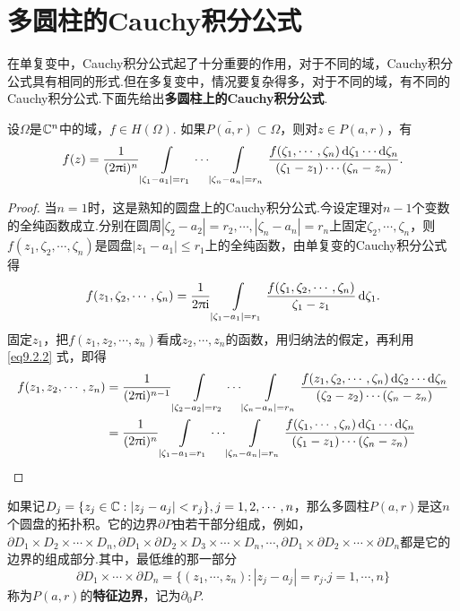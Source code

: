 \section{多圆柱的Cauchy积分公式\label{sec9.2}}
在单复变中，Cauchy积分公式起了十分重要的作用，对于不同的域，Cauchy积分公式具有相同的形式.但在多复变中，情况要复杂得多，对于不同的域，有不同的Cauchy积分公式.下面先给出\textbf{多圆柱上的Cauchy积分公式}.
\begin{theorem}\label{thm9.2.1}
设$\Omega$是$\mathbb C^n$中的域，$f\in H(\Omega)$. 如果$\bar{P(a,r)}\subset \Omega$，则对$z\in P(a,r)$，有
\begin{equation}\label{eq9.2.1}
f(z)=\frac1{(2\uppi\mathrm i)^n}\int\limits_{|\zeta_1-a_1|=r_1}\cdots\int\limits_{|\zeta_n-a_n|=r_n}
\frac{f(\zeta_1,\cdots,\zeta_n)\mathop{}\!\mathrm{d} \zeta_1\cdots\mathop{}\!\mathrm{d} \zeta_n}{(\zeta_1-z_1)\cdots(\zeta_n-z_n)}.
\end{equation}
\end{theorem}
\begin{proof}
当$n=1$时，这是熟知的圆盘上的Cauchy积分公式.今设定理对$n-1$个变数的全纯函数成立.分别在圆周$|\zeta_2-a_2|=r_2,\cdots,|\zeta_n-a_n|=r_n$上固定$\zeta_2,\cdots,\zeta_n$，则$f(z_1,\zeta_2,\cdots,\zeta_n)$是圆盘$|z_1-a_1|\le r_1$上的全纯函数，由单复变的Cauchy积分公式得
\begin{equation}\label{eq9.2.2}
f(z_1,\zeta_2,\cdots,\zeta_n)=\frac1{2\uppi\mathrm i}\int\limits_{|\zeta_1-a_1|=r_1}
\frac{f(\zeta_1,\zeta_2,\cdots,\zeta_n)}{\zeta_1-z_1}\mathop{}\!\mathrm{d} \zeta_1.
\end{equation}
固定$z_1$，把$f(z_1,z_2,\cdots,z_n)$看成$z_2,\cdots,z_n$的函数，用归纳法的假定，再利用 \eqref{eq9.2.2} 式，即得
\begin{align*}
  f(z_1,z_2,\cdots,z_n)&=\frac1{(2\uppi\mathrm i)^{n-1}}\int\limits_{|\zeta_2-a_2|=r_2}\cdots\int\limits_{|\zeta_n-a_n|=r_n}
  \frac{f(z_1,\zeta_2,\cdots,\zeta_n)\mathop{}\!\mathrm{d} \zeta_2\cdots
  \mathop{}\!\mathrm{d} \zeta_n}{(\zeta_2-z_2)\cdots(\zeta_n-z_n)}\\
  & = \frac1{(2\uppi\mathrm i)^n}\int\limits_{|\zeta_1-a_1=r_1} \cdots\int\limits_{|\zeta_n-a_n|=r_n}
  \frac{f(\zeta_1,\cdots,\zeta_n)\mathop{}\!\mathrm{d} \zeta_1\cdots
  \mathop{}\!\mathrm{d} \zeta_n}{(\zeta_1-z_1)\cdots(\zeta_n-z_n)} \qedhere
\end{align*}
\end{proof}

如果记$D_j=\{z_j\in\mathbb C:|z_j-a_j|<r_j\},j=1,2,\cdots,n$，那么多圆柱$P(a,r)$是这$n$个圆盘的拓扑积。它的边界$\partial P$由若干部分组成，例如，$\partial D_1\times D_2\times\cdots\times D_n,\partial D_1\times\partial D_2\times D_3\times\cdots\times D_n,\cdots,\partial D_1\times\partial D_2\times\cdots\times\partial D_n$都是它的边界的组成部分.其中，最低维的那一部分
\[\partial D_1\times\cdots\times\partial D_n=\{(z_1,\cdots,z_n):|z_j-a_j|=r_j.j=1,\cdots,n\}\]
称为$P(a,r)$的\textbf{特征边界}，记为$\partial_0P$.

